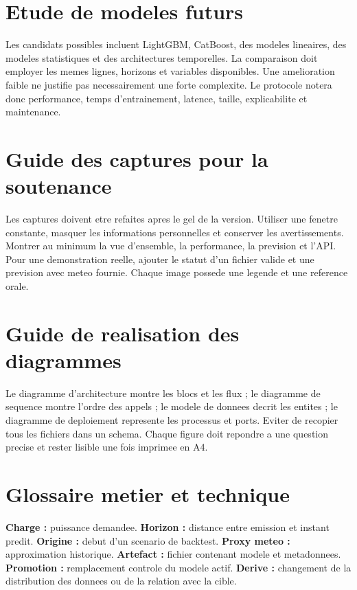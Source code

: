 \clearpage
\section{Etude de modeles futurs}
Les candidats possibles incluent LightGBM, CatBoost, des modeles lineaires, des modeles statistiques et des architectures temporelles. La comparaison doit employer les memes lignes, horizons et variables disponibles. Une amelioration faible ne justifie pas necessairement une forte complexite. Le protocole notera donc performance, temps d'entrainement, latence, taille, explicabilite et maintenance.

\clearpage
\section{Guide des captures pour la soutenance}
Les captures doivent etre refaites apres le gel de la version. Utiliser une fenetre constante, masquer les informations personnelles et conserver les avertissements. Montrer au minimum la vue d'ensemble, la performance, la prevision et l'API. Pour une demonstration reelle, ajouter le statut d'un fichier valide et une prevision avec meteo fournie. Chaque image possede une legende et une reference orale.

\clearpage
\section{Guide de realisation des diagrammes}
Le diagramme d'architecture montre les blocs et les flux ; le diagramme de sequence montre l'ordre des appels ; le modele de donnees decrit les entites ; le diagramme de deploiement represente les processus et ports. Eviter de recopier tous les fichiers dans un schema. Chaque figure doit repondre a une question precise et rester lisible une fois imprimee en A4.

\clearpage
\section{Glossaire metier et technique}
\textbf{Charge :} puissance demandee. \textbf{Horizon :} distance entre emission et instant predit. \textbf{Origine :} debut d'un scenario de backtest. \textbf{Proxy meteo :} approximation historique. \textbf{Artefact :} fichier contenant modele et metadonnees. \textbf{Promotion :} remplacement controle du modele actif. \textbf{Derive :} changement de la distribution des donnees ou de la relation avec la cible.

